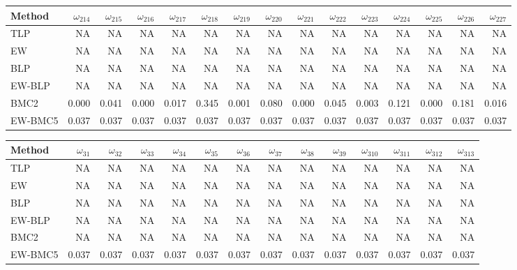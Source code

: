 \documentclass[
]{article}
\begin{document}
\begin{tabular}{lrrrrrrrrrrrrrr}
\toprule
Method & $\omega_{214}$ & $\omega_{215}$ & $\omega_{216}$ & $\omega_{217}$ & $\omega_{218}$ & $\omega_{219}$ & $\omega_{220}$ & $\omega_{221}$ & $\omega_{222}$ & $\omega_{223}$ & $\omega_{224}$ & $\omega_{225}$ & $\omega_{226}$ & $\omega_{227}$\\
\midrule
TLP & NA & NA & NA & NA & NA & NA & NA & NA & NA & NA & NA & NA & NA & NA\\
EW & NA & NA & NA & NA & NA & NA & NA & NA & NA & NA & NA & NA & NA & NA\\
BLP & NA & NA & NA & NA & NA & NA & NA & NA & NA & NA & NA & NA & NA & NA\\
EW-BLP & NA & NA & NA & NA & NA & NA & NA & NA & NA & NA & NA & NA & NA & NA\\
BMC2 & 0.000 & 0.041 & 0.000 & 0.017 & 0.345 & 0.001 & 0.080 & 0.000 & 0.045 & 0.003 & 0.121 & 0.000 & 0.181 & 0.016\\
EW-BMC5 & 0.037 & 0.037 & 0.037 & 0.037 & 0.037 & 0.037 & 0.037 & 0.037 & 0.037 & 0.037 & 0.037 & 0.037 & 0.037 & 0.037\\
\bottomrule
\end{tabular}

\begin{tabular}{lrrrrrrrrrrrrr}
\toprule
Method & $\omega_{31}$ & $\omega_{32}$ & $\omega_{33}$ & $\omega_{34}$ & $\omega_{35}$ & $\omega_{36}$ & $\omega_{37}$ & $\omega_{38}$ & $\omega_{39}$ & $\omega_{310}$ & $\omega_{311}$ & $\omega_{312}$ & $\omega_{313}$\\
\midrule
TLP & NA & NA & NA & NA & NA & NA & NA & NA & NA & NA & NA & NA & NA\\
EW & NA & NA & NA & NA & NA & NA & NA & NA & NA & NA & NA & NA & NA\\
BLP & NA & NA & NA & NA & NA & NA & NA & NA & NA & NA & NA & NA & NA\\
EW-BLP & NA & NA & NA & NA & NA & NA & NA & NA & NA & NA & NA & NA & NA\\
BMC2 & NA & NA & NA & NA & NA & NA & NA & NA & NA & NA & NA & NA & NA\\
EW-BMC5 & 0.037 & 0.037 & 0.037 & 0.037 & 0.037 & 0.037 & 0.037 & 0.037 & 0.037 & 0.037 & 0.037 & 0.037 & 0.037\\
\bottomrule
\end{tabular}
\end{document}
